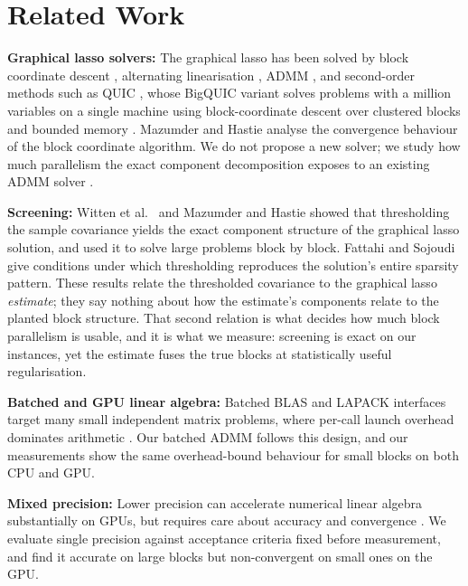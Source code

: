 \documentclass[conference]{IEEEtran}
\begin{document}
\section{Related Work}
\textbf{Graphical lasso solvers:} The graphical lasso \cite{friedman2008,
banerjee2008} has been solved by block coordinate descent \cite{friedman2008},
alternating linearisation \cite{scheinberg2010}, ADMM \cite{boyd2011}, and
second-order methods such as QUIC \cite{hsieh2014quic}, whose BigQUIC variant
solves problems with a million variables on a single machine using
block-coordinate descent over clustered blocks and bounded memory
\cite{hsieh2013bigquic}. Mazumder and Hastie \cite{mazumder2012ejs}
analyse the convergence behaviour of the block coordinate algorithm. We do not
propose a new solver; we study how much parallelism the exact component
decomposition exposes to an existing ADMM solver \cite{gglasso2021}.

\textbf{Screening:} Witten et al.\ \cite{witten2011} and Mazumder and Hastie
\cite{mazumder2012} showed that thresholding the sample covariance yields the
exact component structure of the graphical lasso solution, and used it to
solve large problems block by block. Fattahi and Sojoudi \cite{fattahi2019}
give conditions under which thresholding reproduces the solution's entire
sparsity pattern. These results relate the thresholded covariance to the
graphical lasso \emph{estimate}; they say nothing about how the estimate's
components relate to the planted block structure. That second relation is
what decides how much block parallelism is usable, and it is what we
measure: screening is exact on our instances, yet the estimate fuses the true
blocks at statistically useful regularisation.

\textbf{Batched and GPU linear algebra:} Batched BLAS and LAPACK interfaces
target many small independent matrix problems, where per-call launch overhead
dominates arithmetic \cite{dongarra2017batched}. Our batched ADMM follows
this design, and our measurements show the same overhead-bound behaviour for
small blocks on both CPU and GPU.

\textbf{Mixed precision:} Lower precision can accelerate numerical linear
algebra substantially on GPUs, but requires care about accuracy and
convergence \cite{higham2022mixed,abdelfattah2021survey}. We evaluate single
precision against acceptance criteria fixed before measurement, and find it
accurate on large blocks but non-convergent on small ones on the GPU.
\end{document}
